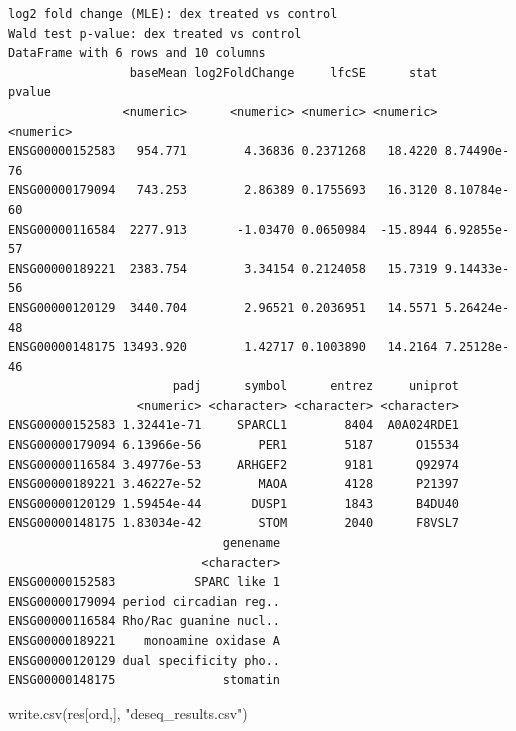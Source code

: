 \documentclass[
  letterpaper,
  DIV=11,
  numbers=noendperiod]{scrartcl}
\newenvironment{Shaded}{\begin{snugshade}}{\end{snugshade}}
\newcommand{\AttributeTok}[1]{\textcolor[rgb]{0.40,0.45,0.13}{#1}}
\newcommand{\CommentTok}[1]{\textcolor[rgb]{0.37,0.37,0.37}{#1}}
\newcommand{\FunctionTok}[1]{\textcolor[rgb]{0.28,0.35,0.67}{#1}}
\newcommand{\NormalTok}[1]{\textcolor[rgb]{0.00,0.23,0.31}{#1}}
\newcommand{\OtherTok}[1]{\textcolor[rgb]{0.00,0.23,0.31}{#1}}
\newcommand{\SpecialCharTok}[1]{\textcolor[rgb]{0.37,0.37,0.37}{#1}}
\newcommand{\StringTok}[1]{\textcolor[rgb]{0.13,0.47,0.30}{#1}}
\begin{document}
\begin{Shaded}
\end{Shaded}

\begin{verbatim}
log2 fold change (MLE): dex treated vs control 
Wald test p-value: dex treated vs control 
DataFrame with 6 rows and 10 columns
                 baseMean log2FoldChange     lfcSE      stat      pvalue
                <numeric>      <numeric> <numeric> <numeric>   <numeric>
ENSG00000152583   954.771        4.36836 0.2371268   18.4220 8.74490e-76
ENSG00000179094   743.253        2.86389 0.1755693   16.3120 8.10784e-60
ENSG00000116584  2277.913       -1.03470 0.0650984  -15.8944 6.92855e-57
ENSG00000189221  2383.754        3.34154 0.2124058   15.7319 9.14433e-56
ENSG00000120129  3440.704        2.96521 0.2036951   14.5571 5.26424e-48
ENSG00000148175 13493.920        1.42717 0.1003890   14.2164 7.25128e-46
                       padj      symbol      entrez     uniprot
                  <numeric> <character> <character> <character>
ENSG00000152583 1.32441e-71     SPARCL1        8404  A0A024RDE1
ENSG00000179094 6.13966e-56        PER1        5187      O15534
ENSG00000116584 3.49776e-53     ARHGEF2        9181      Q92974
ENSG00000189221 3.46227e-52        MAOA        4128      P21397
ENSG00000120129 1.59454e-44       DUSP1        1843      B4DU40
ENSG00000148175 1.83034e-42        STOM        2040      F8VSL7
                              genename
                           <character>
ENSG00000152583           SPARC like 1
ENSG00000179094 period circadian reg..
ENSG00000116584 Rho/Rac guanine nucl..
ENSG00000189221    monoamine oxidase A
ENSG00000120129 dual specificity pho..
ENSG00000148175               stomatin
\end{verbatim}

\begin{Shaded}
\begin{Highlighting}[]
\FunctionTok{write.csv}\NormalTok{(res[ord,], }\StringTok{"deseq\_results.csv"}\NormalTok{)}
\end{Highlighting}
\end{Shaded}

\begin{Shaded}
\end{Shaded}
\end{document}
